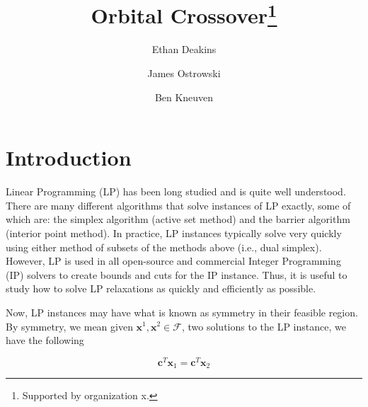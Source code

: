 \documentclass[runningheads]{llncs}
\newcommand{\cF}{{\mathcal F}}
\renewcommand{\vec}[1]{\mathbf{#1}}
\numberwithin{defn}{section} %
\begin{document}
%
\title{Orbital Crossover\thanks{Supported by organization x.}}
%
%
\author{Ethan Deakins  \and
James Ostrowski  \and
Ben Kneuven 
}
%
%
%
\maketitle              %
%
\begin{abstract}

\end{abstract}
%
%
\section{Introduction}

Linear Programming (LP) has been long studied and is quite well understood.  There are many different algorithms that solve instances of LP exactly, some of which are: the simplex algorithm (active set method) and the barrier algorithm (interior point method).  In practice, LP instances typically solve very quickly using either method of subsets of the methods above (i.e., dual simplex).  However, LP is used in all open-source and commercial Integer Programming (IP) solvers to create bounds and cuts for the IP instance.  Thus, it is useful to study how to solve LP relaxations as quickly and efficiently as possible.

Now, LP instances may have what is known as symmetry in their feasible region.  By symmetry, we mean given $\vec{x}^1, \vec{x}^2 \in \cF$, two solutions to the LP instance, we have the following

\begin{equation}
\label{sym}
\vec{c}^T\vec{x}_1 = \vec{c}^T\vec{x}_2
\end{equation}
\end{document}
